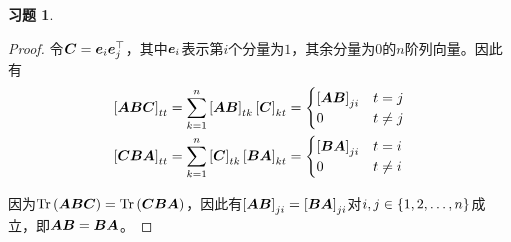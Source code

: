\documentclass{ctexart}
\newtheorem{problem}{习题}[section]
\begin{document}
\begin{problem}
\end{problem}
\begin{proof}
令\(\boldsymbol{C}=\boldsymbol{e}_i\boldsymbol{e}_j^\top\)，其中\(\boldsymbol{e}_i\)表示第\(i\)个分量为\(1\)，其余分量为\(0\)的\(n\)阶列向量。因此有
    \begin{align*}
        \left[ \boldsymbol{A}\boldsymbol{B}\boldsymbol{C} \right]_{tt} & =\sum_{k=1}^n\left[ \boldsymbol{A}\boldsymbol{B} \right]_{tk}\left[ \boldsymbol{C} \right]_{kt}=
        \begin{cases}
            \left[ \boldsymbol{A}\boldsymbol{B} \right]_{ji} & t=j     \\
            0                     & t\neq j
        \end{cases}                                                       \\
        \left[ \boldsymbol{C}\boldsymbol{B}\boldsymbol{A} \right]_{tt} & =\sum_{k=1}^n\left[ \boldsymbol{C} \right]_{tk}\left[ \boldsymbol{B}\boldsymbol{A} \right]_{kt}=
        \begin{cases}
            \left[ \boldsymbol{B}\boldsymbol{A} \right]_{ji} & t=i     \\
            0                     & t\neq i
        \end{cases}
    \end{align*}

    因为\(\mathrm{Tr}\left( \boldsymbol{A}\boldsymbol{B}\boldsymbol{C} \right)=\mathrm{Tr}\left( \boldsymbol{C}\boldsymbol{B}\boldsymbol{A} \right)\)，因此有\(\left[ \boldsymbol{A}\boldsymbol{B} \right]_{ji}=\left[ \boldsymbol{B}\boldsymbol{A} \right]_{ji}\)对\(i,j\in\left\{1,2,\dots,n \right\}\)成立，即\(\boldsymbol{A}\boldsymbol{B}=\boldsymbol{B}\boldsymbol{A}\)。
\end{proof}
\end{document}
